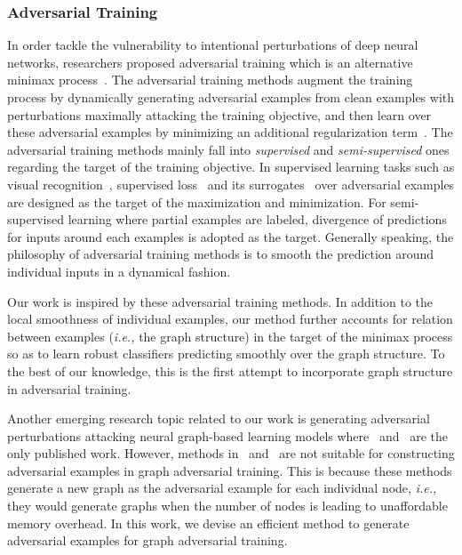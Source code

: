 \documentclass[10pt,journal,compsoc]{IEEEtran}
\newcommand{\ie}{\emph{i.e., }}
\begin{document}
\subsubsection{Adversarial Training}
In order tackle the vulnerability to intentional perturbations of deep neural networks, researchers proposed adversarial training which is an alternative minimax process~\cite{szegedy2014intriguing}. The adversarial training methods augment the training process by dynamically generating adversarial examples from clean examples with perturbations maximally attacking the training objective, and then learn over these adversarial examples by minimizing an additional regularization term~\cite{dezfooli2017universal,wu2017adversarial,goodfellow2015explaining,miyato2016adversarial,miyato2018virtual,liao2018defense,tramer2018ensemble,raghunathan2019certified}. The adversarial training methods mainly fall into \textit{supervised} and \textit{semi-supervised} ones regarding the target of the training objective. In supervised learning tasks such as visual recognition~\cite{goodfellow2015explaining}, supervised loss~\cite{dezfooli2017universal,wu2017adversarial,goodfellow2015explaining} and its surrogates~\cite{liao2018defense,tramer2018ensemble,raghunathan2019certified} over adversarial examples are designed as the target of the maximization and minimization. For semi-supervised learning where partial examples are labeled, divergence of predictions for inputs around each examples is adopted as the target. Generally speaking, the philosophy of adversarial training methods is to smooth the prediction around individual inputs in a dynamical fashion.

Our work is inspired by these adversarial training methods. In addition to the local smoothness of individual examples, our method further accounts for relation between examples (\ie the graph structure) in the target of the minimax process so as to learn robust classifiers predicting smoothly over the graph structure. To the best of our knowledge, this is the first attempt to incorporate graph structure in adversarial training. 

Another emerging research topic related to our work is generating adversarial perturbations attacking neural graph-based learning models where~\cite{dai2018adversarial} and~\cite{zugner2018adversarial} are the only published work. However, methods in~\cite{dai2018adversarial} and~\cite{zugner2018adversarial} are not suitable for constructing adversarial examples in graph adversarial training. This is because these methods generate a new graph as the adversarial example for each individual node, \ie they would generate  graphs when the number of nodes is  leading to unaffordable memory overhead. In this work, we devise an efficient method to generate adversarial examples for graph adversarial training.
\end{document}

